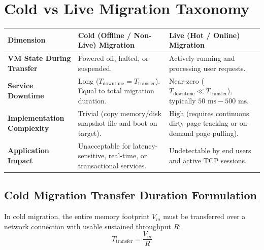 \documentclass[11pt,a4paper,openany]{report}
\begin{document}
\section{Cold vs Live Migration Taxonomy}
\begin{center}
\begin{tabularx}{\textwidth}{>{\bfseries}l X X}
\toprule
Dimension & Cold (Offline / Non-Live) Migration & Live (Hot / Online) Migration\\
\midrule
VM State During Transfer & Powered off, halted, or suspended. & Actively running and processing user requests.\\
Service Downtime & Long ($T_{\text{downtime}} = T_{\text{transfer}}$). Equal to total migration duration. & Near-zero ($T_{\text{downtime}} \ll T_{\text{transfer}}$), typically $50\text{ ms} - 500\text{ ms}$.\\
Implementation Complexity & Trivial (copy memory/disk snapshot file and boot on target). & High (requires continuous dirty-page tracking or on-demand page pulling).\\
Application Impact & Unacceptable for latency-sensitive, real-time, or transactional services. & Undetectable by end users and active TCP sessions.\\
\bottomrule
\end{tabularx}
\end{center}

\subsection{Cold Migration Transfer Duration Formulation}
In cold migration, the entire memory footprint $V_m$ must be transferred over a network connection with usable sustained throughput $R$:
\begin{equation}
T_{\text{transfer}} = \frac{V_m}{R}
\end{equation}
\end{document}
